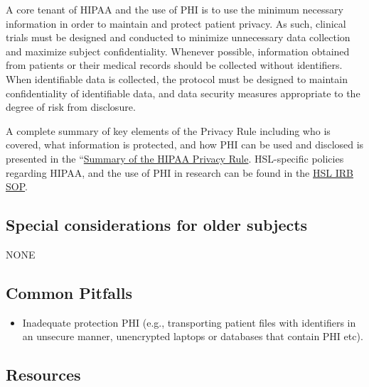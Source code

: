 \documentclass[]{book}
\providecommand{\tightlist}{%
  \setlength{\itemsep}{0pt}\setlength{\parskip}{0pt}}
\theoremstyle{definition}
\theoremstyle{definition}
\theoremstyle{definition}
\theoremstyle{remark}
\begin{document}
A core tenant of HIPAA and the use of PHI is to use the minimum
necessary information in order to maintain and protect patient privacy.
As such, clinical trials must be designed and conducted to minimize
unnecessary data collection and maximize subject confidentiality.
Whenever possible, information obtained from patients or their medical
records should be collected without identifiers. When identifiable data
is collected, the protocol must be designed to maintain confidentiality
of identifiable data, and data security measures appropriate to the
degree of risk from disclosure.

A complete summary of key elements of the Privacy Rule including who is
covered, what information is protected, and how PHI can be used and
disclosed is presented in the
``\href{http://www.hhs.gov/hipaa/for-professionals/privacy/laws-regulations/index.html}{Summary
of the HIPAA Privacy Rule}. HSL-specific policies regarding HIPAA, and
the use of PHI in research can be found in the
\href{http://thehslhub/~/media/HSLNet/Docs/IFAR/IRB/IRB_SOP.ashx}{HSL
IRB SOP}.

\subsection{Special considerations for older
subjects}\label{special-considerations-for-older-subjects-1}

NONE

\subsection{Common Pitfalls}\label{common-pitfalls-4}

\begin{itemize}
\tightlist
\item
  Inadequate protection PHI (e.g., transporting patient files with
  identifiers in an unsecure manner, unencrypted laptops or databases
  that contain PHI etc).
\end{itemize}

\subsection{Resources}\label{resources-5}
\end{document}

